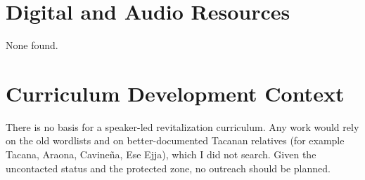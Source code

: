 \documentclass[12pt]{article}
\begin{document}
\section{Digital and Audio Resources}
None found.

\section{Curriculum Development Context}
There is no basis for a speaker-led revitalization curriculum. Any work would rely on the old wordlists and on better-documented Tacanan relatives (for example Tacana, Araona, Cavine\~na, Ese Ejja), which I did not search. Given the uncontacted status and the protected zone, no outreach should be planned.
\end{document}
